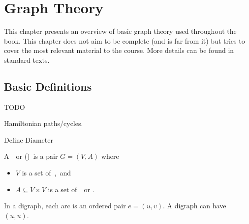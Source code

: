 \chapter{Graph Theory}
\label{ch:bg::graphs}

\begin{cluster}
\label{grp:prmbl:bg::graphs::presents}

\begin{preamble}
\label{prmbl:bg::graphs::presents}
This chapter presents an overview of basic graph theory
used throughout the book.
This chapter does not aim to be complete (and is far from it) but
tries to cover the most relevant material to the course.  
More details can be found in standard texts.

\end{preamble}
\end{cluster}


\section{Basic Definitions}
\label{sec:bg::graphs::basics}

\begin{cluster}
\label{grp:tch:bg::graphs::todo}

\begin{teachnote}
\label{tch:bg::graphs::todo}
TODO

Hamiltonian paths/cycles.

Define Diameter

\end{teachnote}
\end{cluster}

\begin{cluster}
\label{grp:def:bg::graphs::directed-graph}

\begin{definition}
\label{def:bg::graphs::directed-graph}
A~~or ()~is a pair $G = (V,A)$
where
\begin{itemize}
\item $V$ is a set of~,~and

\item $A \subseteq V \times V$ is a set of~~or .
\end{itemize}

\end{definition}
\end{cluster}

\begin{cluster}
\label{grp:nt:bg::graphs::digraph}

\begin{note}
\label{nt:bg::graphs::digraph}
In a digraph, each arc is an ordered pair $e = (u,v)$.  A digraph can
have~~$(u,u)$.  

\end{note}
\end{cluster}

